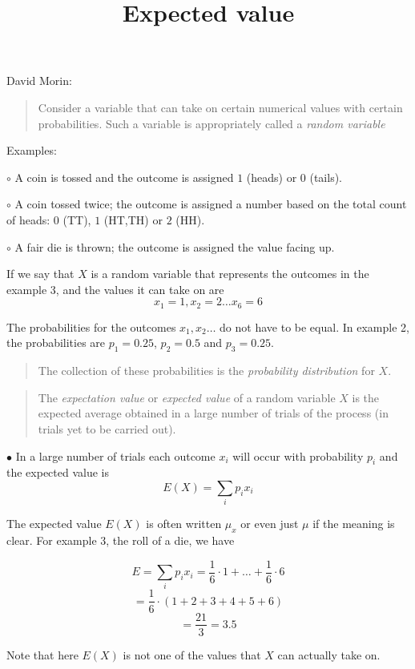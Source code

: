 \documentclass[11pt, oneside]{article}
\title{Expected value}
\date{}
\begin{document}
\maketitle
\Large

David Morin:
\begin{quote}\color{blue}Consider a variable that can take on certain numerical values with certain probabilities.  Such a variable is appropriately called a \emph{random variable}\color{black}\end{quote}

Examples:

$\circ$ A coin is tossed and the outcome is assigned $1$ (heads) or $0$ (tails).

$\circ$ A coin tossed twice; the outcome is assigned a number based on the total count of heads:  $0$ (TT), $1$ (HT,TH) or $2$ (HH).

$\circ$ A fair die is thrown;  the outcome is assigned the value facing up.

If we say that $X$ is a random variable that represents the outcomes in the example 3, and the values it can take on are
\[ x_1 = 1, x_2 = 2 \dots x_6 = 6 \]

The probabilities for the outcomes $x_1, x_2 \dots$ do not have to be equal.  In example 2, the probabilities are $p_1 = 0.25$, $p_2 = 0.5$ and $p_3 = 0.25$.

\begin{quote}\color{blue}The collection of these probabilities is the \emph{probability distribution} for $X$.\end{quote}

\begin{quote}The \emph{expectation value} or \emph{expected value} of a random variable $X$ is the expected average obtained in a large number of trials of the process (in trials yet to be carried out).\color{black}\end{quote}

$\bullet$ In a large number of trials each outcome $x_i$ will occur with probability $p_i$ and the expected value is
\[ E(X) = \sum_i p_i x_i  \]

The expected value $E(X)$ is often written $\mu_x$ or even just $\mu$ if the meaning is clear.  For example 3, the roll of a die, we have

\[ E = \sum_i p_i x_i = \frac{1}{6} \cdot 1 + \dots + \frac{1}{6} \cdot 6  \]
\[ = \frac{1}{6} \cdot (1 + 2 + 3 + 4 + 5 + 6 ) \]
\[ = \frac{21}{3} = 3.5 \]

Note that here $E(X)$ is not one of the values that $X$ can actually take on.
\end{document}
